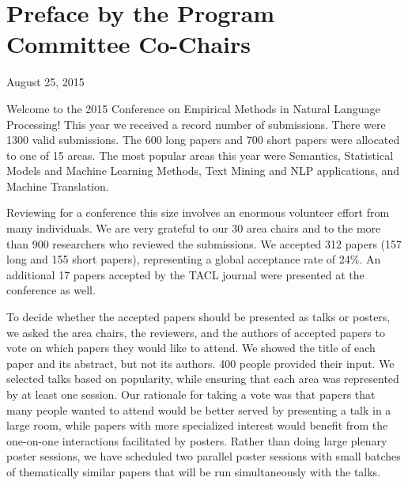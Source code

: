 \newpage{}


\section{Preface by the Program Committee Co-Chairs}

\begin{flushright}
August 25, 2015 
\par\end{flushright}

\noindent Welcome to the 2015 Conference on Empirical Methods in Natural
Language Processing! This year we received a record number of submissions.
There were 1300 valid submissions. The 600 long papers and 700 short
papers were allocated to one of 15 areas. The most popular areas this
year were Semantics, Statistical Models and Machine Learning Methods,
Text Mining and NLP applications, and Machine Translation.

Reviewing for a conference this size involves an enormous volunteer
effort from many individuals. We are very grateful to our 30 area
chairs and to the more than 900 researchers who reviewed the submissions.
We accepted 312 papers (157 long and 155 short papers), representing
a global acceptance rate of 24\%. An additional 17 papers accepted
by the TACL journal were presented at the conference as well.

To decide whether the accepted papers should be presented as talks
or posters, we asked the area chairs, the reviewers, and the authors
of accepted papers to vote on which papers they would like to attend.
We showed the title of each paper and its abstract, but not its authors.
400 people provided their input. We selected talks based on popularity,
while ensuring that each area was represented by at least one session.
Our rationale for taking a vote was that papers that many people wanted
to attend would be better served by presenting a talk in a large room,
while papers with more specialized interest would benefit from the
one-on-one interactions facilitated by posters. Rather than doing
large plenary poster sessions, we have scheduled two parallel poster
sessions with small batches of thematically similar papers that will
be run simultaneously with the talks.

